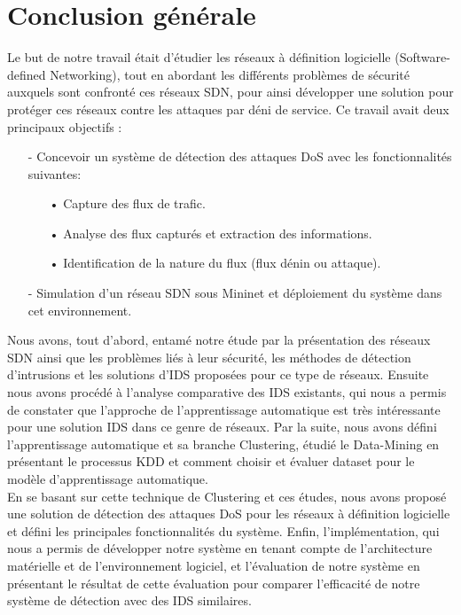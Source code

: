
\chapter{Conclusion générale} 

\label{Conclusion} 

Le but de notre travail était d’étudier les réseaux à définition logicielle (Software-defined Networking), tout en abordant les différents problèmes de sécurité auxquels sont confronté ces réseaux SDN, pour ainsi développer une solution pour protéger ces réseaux contre les attaques par déni de service. Ce travail avait deux principaux objectifs :
\begin{itemize}
\item[-] Concevoir un système de détection des attaques DoS avec les fonctionnalités suivantes:\\
\begin{itemize}
\item[•] Capture des flux de trafic.
\item[•] Analyse des flux capturés et extraction des informations.
\item[•] Identification de la nature du flux (flux dénin ou attaque).\\
\end{itemize}
\item[-] Simulation d'un réseau SDN sous Mininet et déploiement du système dans cet environnement.\\
\end{itemize}

\noindent Nous avons, tout d'abord, entamé notre étude par la présentation des réseaux SDN ainsi que les problèmes liés à leur sécurité, les méthodes de détection d’intrusions et les solutions d’IDS proposées pour ce type de réseaux. Ensuite nous avons procédé à l'analyse comparative des IDS existants, qui nous a permis de constater que l’approche de l’apprentissage automatique est très intéressante pour une solution IDS dans ce genre de réseaux. Par la suite, nous avons défini l’apprentissage automatique et sa branche Clustering, étudié le Data-Mining en présentant le processus KDD et comment choisir et évaluer dataset pour le modèle d’apprentissage automatique. \\

\noindent En se basant sur cette technique de Clustering et ces études, nous avons proposé une solution de détection des attaques DoS pour les réseaux à définition logicielle et défini les principales fonctionnalités du système. Enfin, l'implémentation, qui nous a permis de développer notre système en tenant compte de l'architecture matérielle et de l'environnement logiciel, et l’évaluation de notre système en présentant le résultat de cette évaluation pour comparer l’efficacité de notre système de détection avec des IDS similaires.\\

